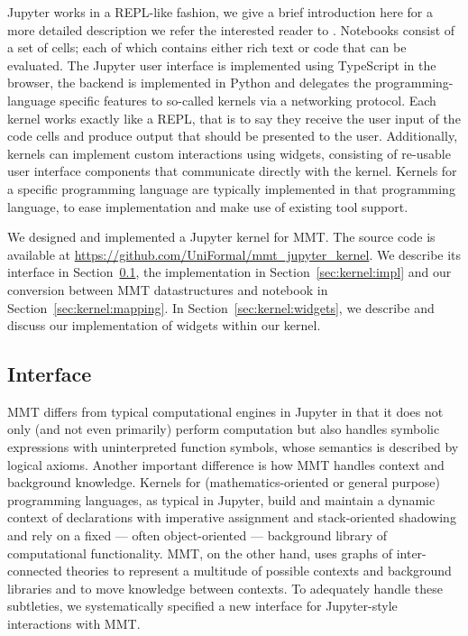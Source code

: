 Jupyter works in a REPL-like fashion, we give a brief introduction here for a more detailed description we refer the interested reader to . 
Notebooks consist of a set of cells; each of which contains either rich text or code that can be evaluated. 
The Jupyter user interface is implemented using TypeScript in the browser, the backend is implemented in Python and delegates the programming-language specific features to so-called kernels via a networking protocol. 
Each kernel works exactly like a REPL, that is to say they receive the user input of the code cells and produce output that should be presented to the user. 
Additionally, kernels can implement custom interactions using widgets, consisting of re-usable user interface components that communicate directly with the kernel.  
Kernels for a specific programming language are typically implemented in that programming language, to ease implementation and make use of existing tool support. 

We designed and implemented a Jupyter kernel for MMT. 
The source code is available at \url{https://github.com/UniFormal/mmt_jupyter_kernel}. 
We describe its interface in Section~\ref{sec:kernel:syntax}, the implementation in Section~\ref{sec:kernel:impl} and our conversion between MMT datastructures and notebook in Section~\ref{sec:kernel:mapping}.
In Section~\ref{sec:kernel:widgets}, we describe and discuss our implementation of widgets within our kernel. 

\subsection{Interface}\label{sec:kernel:syntax}

MMT differs from typical computational engines in Jupyter in that it does not only (and not even primarily) perform computation but also handles symbolic expressions with uninterpreted function symbols, whose semantics is described by logical axioms.
Another important difference is how MMT handles context and background knowledge.
Kernels for (mathematics-oriented or general purpose) programming languages, as typical in Jupyter, build and maintain a dynamic context of declarations with imperative assignment and stack-oriented shadowing and rely on a fixed --- often object-oriented --- background library of computational functionality.
MMT, on the other hand, uses graphs of inter-connected theories to represent a multitude of possible contexts and background libraries and to move knowledge between contexts.
To adequately handle these subtleties, we systematically specified a new interface for Jupyter-style interactions with MMT.

